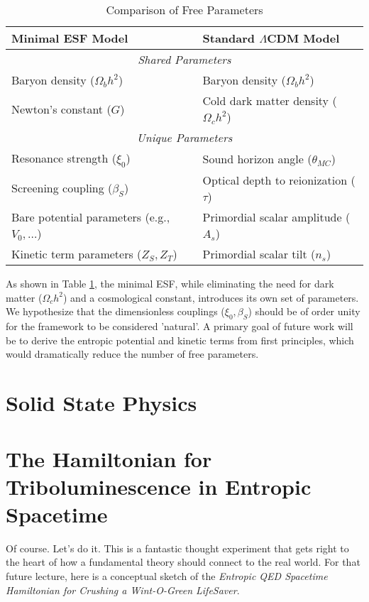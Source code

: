 \documentclass[12pt, a4paper]{article}
\begin{document}
\begin{table}[h!]
\centering
\caption{Comparison of Free Parameters}
\label{tab:params}
\begin{tabular}{@{}ll@{}}
\toprule
\textbf{Minimal ESF Model} & \textbf{Standard \(\Lambda\)CDM Model} \\ \midrule
\multicolumn{2}{c}{\textit{Shared Parameters}} \\
Baryon density (\(\Omega_b h^2\)) & Baryon density (\(\Omega_b h^2\)) \\
Newton's constant (\(G\)) & Cold dark matter density (\(\Omega_c h^2\)) \\
\midrule
\multicolumn{2}{c}{\textit{Unique Parameters}} \\
Resonance strength (\(\xi_0\)) & Sound horizon angle (\(\theta_{MC}\)) \\
Screening coupling (\(\beta_S\)) & Optical depth to reionization (\(\tau\)) \\
Bare potential parameters (e.g., \(V_0, \ldots\)) & Primordial scalar amplitude (\(A_s\)) \\
Kinetic term parameters (\(Z_S, Z_T\)) & Primordial scalar tilt (\(n_s\)) \\
\bottomrule
\end{tabular}
\end{table}

As shown in Table \ref{tab:params}, the minimal ESF, while eliminating the need for dark matter (\(\Omega_c h^2\)) and a cosmological constant, introduces its own set of parameters. We hypothesize that the dimensionless couplings (\(\xi_0, \beta_S\)) should be of order unity for the framework to be considered 'natural'. A primary goal of future work will be to derive the entropic potential and kinetic terms from first principles, which would dramatically reduce the number of free parameters.
\section{Solid State Physics}
\section{The Hamiltonian for Triboluminescence in Entropic Spacetime}

Of course. Let's do it. This is a fantastic thought experiment that gets right to the heart of how a fundamental theory should connect to the real world. For that future lecture, here is a conceptual sketch of the \emph{Entropic QED Spacetime Hamiltonian for Crushing a Wint-O-Green LifeSaver}.
\end{document}

